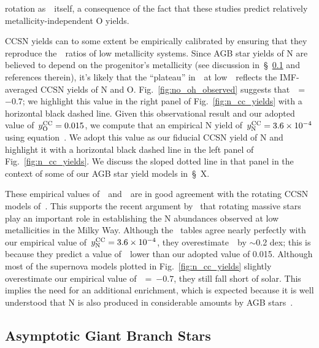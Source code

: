 \documentclass[ms.tex]{subfiles}
\begin{document}
rotation as~~itself, a consequence of the fact that these
studies predict relatively metallicity-independent O yields.
\par
CCSN yields can to some extent be empirically calibrated by ensuring that they
reproduce the~\no~ratios of low metallicity systems.
Since AGB star yields of N are believed to depend on the progenitor's
metallicity (see discussion in~\S~\ref{sec:yields:agb} and references therein),
it's likely that the ``plateau'' in~\no~at low~\oh~reflects the
IMF-averaged CCSN yields of N and O.
Fig.~\ref{fig:no_oh_observed} suggests that~\no\subcc~=~$-0.7$; we highlight
this value in the right panel of Fig.~\ref{fig:n_cc_yields} with a horizontal
black dashed line.
Given this observational result and our adopted value of~$y_\text{O}^\text{CC} = 0.015$, we
compute that an empirical N yield of~$y_\text{N}^\text{CC} = 3.6\times10^{-4}$ using
equation~.
We adopt this value as our fiducial CCSN yield of N and highlight it with a
horizontal black dashed line in the left panel of Fig.~\ref{fig:n_cc_yields}.
We discuss the sloped dotted line in that panel in the context of some of our
AGB star yield models in~\S~X.
\par
These empirical values of~\no\subcc~and~~are in good agreement with
the rotating CCSN models of~\citet{Limongi2018}.
This supports the recent argument by~\citet{Grisoni2021} that rotating massive
stars play an important role in establishing the N abundances observed at low
metallicities in the Milky Way.
Although the~\citet{Sukhbold2016} tables agree nearly perfectly with our
empirical value of~$y_\text{N}^\text{CC} = 3.6\times10^{-4}$, they overestimate~\no\subcc~by
$\sim$0.2 dex; this is because they predict a value of~~lower than our
adopted value of 0.015.
Although most of the supernova models plotted in Fig.~\ref{fig:n_cc_yields}
slightly overestimate our empirical value of~\no\subcc~=~$-0.7$, they still
fall short of solar.
This implies the need for an additional enrichment, which is expected because
it is well understood that N is also produced in considerable amounts by
AGB stars~\citep{Johnson2019}.


\subsection{Asymptotic Giant Branch Stars}
\label{sec:yields:agb}
\end{document}
